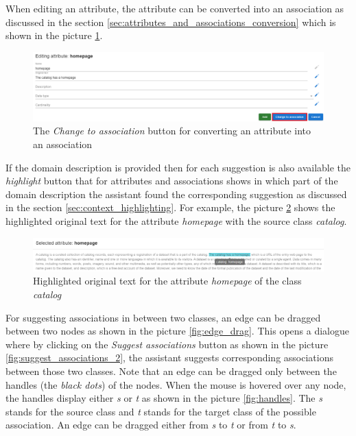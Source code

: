 When editing an attribute, the attribute can be converted into an association as discussed in the section \ref{sec:attributes_and_associations_conversion} which is shown in the picture \ref{fig:change_to_association}.

\begin{figure}[!h]
    \includegraphics[scale=0.3]{../docs/images/frontend/change-to-association.png}
    \caption{\centering The \textit{Change to association} button for converting an attribute into an association}
    \label{fig:change_to_association}
\end{figure}

If the domain description is provided then for each suggestion is also available the \textit{highlight} button that for attributes and associations shows in which part of the domain description the assistant found the corresponding suggestion as discussed in the section \ref{sec:context_highlighting}. For example, the picture \ref{fig:highlight_original_text} shows the highlighted original text for the attribute \textit{homepage} with the source class \textit{catalog}.

\begin{figure}[!h]
    \includegraphics[scale=0.33]{../docs/images/frontend/highlight-original-text.png}
    \caption{\centering Highlighted original text for the attribute \textit{homepage} of the class \textit{catalog}}
    \label{fig:highlight_original_text}
\end{figure}

For suggesting associations in between two classes, an edge can be dragged between two nodes as shown in the picture \ref{fig:edge_drag}. This opens a dialogue where by clicking on the \textit{Suggest associations} button as shown in the picture \ref{fig:suggest_associations_2}, the assistant suggests corresponding associations between those two classes. Note that an edge can be dragged only between the handles (the \textit{black dots}) of the nodes. When the mouse is hovered over any node, the handles display either \textit{s} or \textit{t} as shown in the picture \ref{fig:handles}. The \textit{s} stands for the source class and \textit{t} stands for the target class of the possible association. An edge can be dragged either from \textit{s} to \textit{t} or from \textit{t} to \textit{s}.

